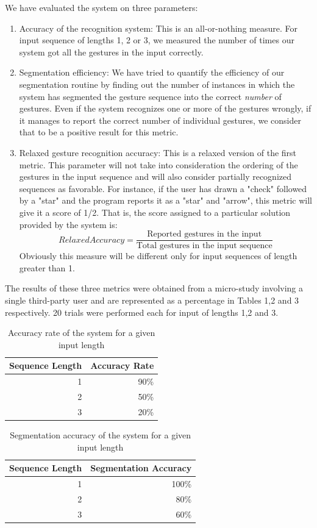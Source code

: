 \documentclass[twoside]{article}
\begin{document}
\begin{multicols}{2}
We have evaluated the system on three parameters:
\begin{enumerate}
	\item Accuracy of the recognition system: This is an all-or-nothing measure. For input sequence of lengths 1, 2 or 3, we measured the number of times our system got all the gestures in the input correctly.
	\item Segmentation efficiency: We have tried to quantify the efficiency of our segmentation routine by finding out the number of instances in which the system has segmented the gesture sequence into the correct \emph{number} of gestures. Even if the system recognizes one or more of the gestures wrongly, if it manages to report the correct number of individual gestures, we consider that to be a positive result for this metric.
	\item Relaxed gesture recognition accuracy: This is a relaxed version of the first metric. This parameter will not take into consideration the ordering of the gestures in the input sequence and will also consider partially recognized sequences as favorable. For instance, if the user has drawn a "check" followed by a "star" and the program reports it as a "star" and "arrow", this metric will give it a score of 1/2. That is, the score assigned to a particular solution provided by the system is:
	\[
		Relaxed Accuracy = \frac{\text{Reported gestures in the input}}{\text{Total gestures in the input sequence}}
	\]
Obviously this measure will be different only for input sequences of length greater than 1.
\end{enumerate}
The results of these three metrics were obtained from a micro-study involving a single third-party user and are represented as a percentage in Tables 1,2 and 3 respectively. 20 trials were performed each for input of lengths 1,2 and 3.

\begin{table}[H]
  \centering
  \caption{Accuracy rate of the system for a given input length}
    \begin{tabular}{rr}
    \toprule
    Sequence Length & Accuracy Rate \\
    \midrule
    1     & 90\% \\
    2     & 50\% \\
    3     & 20\% \\
    \bottomrule
    \end{tabular}%
  \label{tab:addlabel}%
\end{table}%

\begin{table}[H]
  \centering
  \caption{Segmentation accuracy of the system for a given input length}
    \begin{tabular}{rr}
    \toprule
	Sequence Length & Segmentation Accuracy \\
    \midrule
    1     & 100\% \\
    2     & 80\% \\
    3     & 60\% \\
    \bottomrule
    \end{tabular}%
  \label{tab:addlabel}%
\end{table}%


\end{multicols}
\end{document}
